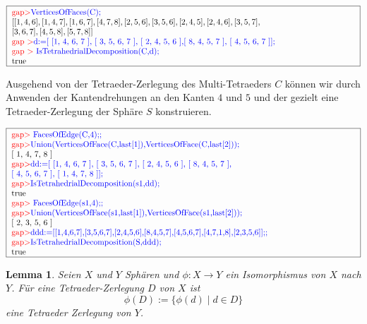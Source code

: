 \documentclass[12pt,titlepage,twoside,cleardoublepage]{article}
\theoremstyle{nummermitklammern}
\newtheorem{lemma}[temp]{Lemma}
\newtheorem{lemma}[zahl]{Lemma}
\numberwithin{equation}{section}
\begin{document}
\begin{center}
 $\fbox{
\parbox{15cm}{
\textcolor{red}{gap$>$}\textcolor{blue}{ VerticesOfFaces(C);}\newline 
$[ [ 1, 4, 6 ], [ 1, 4, 7 ], [ 1, 6, 7 ], [ 4, 7, 8 ], [ 2, 5, 6 ],
[ 3, 5, 6 ],[ 2, 4, 5 ], [ 2, 4, 6 ], [ 3, 5, 7 ],$ \newline
$  [ 3, 6, 7 ],
[ 4, 5, 8 ], [ 5, 7, 8 ] ]$\newline
\textcolor{red}{gap $>$}\textcolor{blue}{d:=[ [1, 4, 6, 7 ], [ 3, 5, 6, 7 ], [ 2, 4, 5, 6 ],[ 8, 4, 5, 7 ], [ 4, 5, 6, 7 ]];}\newline
\textcolor{red}{gap $>$} \textcolor{blue}{IsTetrahedrialDecomposition(C,d);}\newline
true
 }}$
 \end{center}
 Ausgehend von der Tetraeder-Zerlegung des Multi-Tetraeders $C$ können wir durch Anwenden der Kantendrehungen an den Kanten $4$ und $5$ und der  gezielt eine Tetraeder-Zerlegung der Sphäre $S$ konstruieren.
 \begin{center}
 $\fbox{
\parbox{15cm}{
\textcolor{red}{gap$>$} \textcolor{blue}{FacesOfEdge(C,4);;}\newline 
\textcolor{red}{gap$>$}\textcolor{blue}{Union(VerticesOfFace(C,last[1]),VerticesOfFace(C,last[2]));}
\newline
 [ 1, 4, 7, 8 ]\newline 
\textcolor{red}{gap$>$}\textcolor{blue}{dd:=[ [1, 4, 6, 7 ], [ 3, 5, 6, 7 ], [ 2, 4, 5, 6 ], [ 8, 4, 5, 7 ],$ \newline $ [ 4, 5, 6, 7 ], [ 1,
4, 7, 8 ]];}\newline 
\textcolor{red}{gap$>$}\textcolor{blue}{ IsTetrahedrialDecomposition(s1,dd);}\newline 
true\newline 
\textcolor{red}{gap$>$} \textcolor{blue}{FacesOfEdge(s1,4);;}\newline 
\textcolor{red}{gap$>$}\textcolor{blue}{Union(VerticesOfFace(s1,last[1]),VerticesOfFace(s1,last[2]));}
\newline [ 2, 3, 5, 6 ]\newline 
\textcolor{red}{gap$>$}\textcolor{blue}{ddd:=[[1,4,6,7],[3,5,6,7],[2,4,5,6],[8,4,5,7],[4,5,6,7],[4,7,1,8],[2,3,5,6]];;}\newline 
\textcolor{red}{gap$>$}\textcolor{blue}{IsTetrahedrialDecomposition(S,ddd);}\newline 
true
 }}$
 \end{center}
\begin{lemma}
Seien $X$ und $Y$ Sphären und $\phi:X\to Y$ ein Isomorphismus von $X$ nach $Y$. Für eine Tetraeder-Zerlegung $D$ von $X$ ist \[
\phi(D):=\{\phi(d)\mid d\in D\}
\] eine Tetraeder Zerlegung von $Y$.
\end{lemma}
\end{document}
